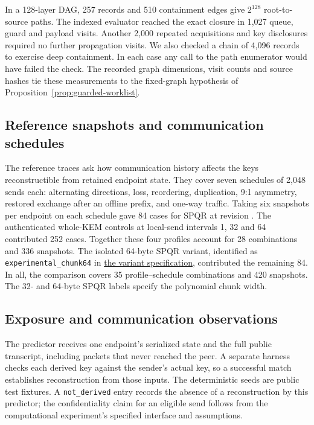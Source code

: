 \documentclass[pdflatex]{sn-jnl}
\theoremstyle{thmstyleone}
\theoremstyle{thmstylethree}
\theoremstyle{thmstyletwo}
\begin{document}
In a 128-layer DAG, 257 records and 510 containment edges give
$2^{128}$ root-to-source paths. The indexed evaluator reached the
exact closure in 1,027 queue, guard and payload visits. Another 2,000
repeated acquisitions and key disclosures required no further
propagation visits. We also checked a chain of 4,096 records to
exercise deep containment. In each case any call to the path
enumerator would have failed the check. The recorded graph dimensions,
visit counts and source hashes tie these measurements to the
fixed-graph hypothesis of Proposition~\ref{prop:guarded-worklist}.

\subsection{Reference snapshots and communication schedules}

The reference traces ask how communication history affects the keys
reconstructible from retained endpoint state. They cover seven schedules
of 2,048 sends each: alternating directions, loss, reordering,
duplication, 9:1 asymmetry, restored exchange after an offline prefix,
and one-way traffic. Taking six snapshots per endpoint on each schedule gave 84
cases for SPQR at revision
. The authenticated
whole-KEM controls at local-send intervals 1, 32 and 64 contributed
252 cases. Together these four profiles account for 28 combinations
and 336 snapshots. The isolated 64-byte SPQR variant, identified as
\texttt{experimental\_chunk64} in
\href{https://github.com/billlza/q-periapt/blob/228c944fc476e3e57d6c08063cacb19bca5b360e/research/continuity-spqr-reference/variants/README.md}{the variant specification},
contributed the remaining 84. In all, the comparison covers
35 profile--schedule combinations and 420 snapshots. The 32- and
64-byte SPQR labels specify the polynomial chunk width.

\subsection{Exposure and communication observations}


The predictor receives one endpoint's serialized state and the full
public transcript, including packets that never reached the peer. A
separate harness checks each derived key against the sender's actual key,
so a successful match establishes reconstruction from those inputs. The
deterministic seeds are public test fixtures. A \texttt{not\_derived}
entry records the absence of a reconstruction by this predictor; the
confidentiality claim for an eligible send follows from the computational
experiment's specified interface and assumptions.
\end{document}
